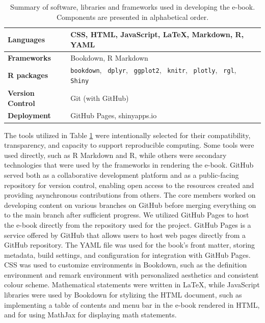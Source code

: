 \documentclass[11pt]{article}
\begin{document}
\renewcommand\arraystretch{1.20}
\begin{table}[H]
\setlength{\belowcaptionskip}{-25pt}
\begin{center}
\begin{tabular}{| l | l |}
\hline
\textbf{Languages}		&	CSS, HTML, JavaScript, LaTeX, Markdown, R, YAML\\
\hline
\textbf{Frameworks} 		&	Bookdown, R Markdown\\
\hline
\textbf{R packages}		&	\texttt{bookdown}, \, \texttt{dplyr}, \, \texttt{ggplot2}, \, \texttt{knitr}, \, \texttt{plotly}, \, \texttt{rgl}, \,\texttt{Shiny}\\
\hline
\textbf{Version Control} 	&	Git (with GitHub)\\
\hline
\textbf{Deployment} 		&	GitHub Pages, shinyapps.io\\
\hline
\end{tabular}
\caption{Summary of software, libraries and frameworks used in developing the e-book. Components are presented in alphabetical order.}
\label{tab:ebook_Technologies}
\end{center}
\end{table}
\renewcommand\arraystretch{1.00}

The tools utilized in Table \ref{tab:ebook_Technologies} were intentionally selected for their compatibility, transparency, and capacity to support reproducible computing. 
Some tools were used directly, such as R Markdown and R, while others were secondary technologies that were used by the frameworks in rendering the e-book.
GitHub served both as a collaborative development platform and as a public-facing repository for version control, enabling open access to the resources created and providing asynchronous contributions from others.
The core members worked on developing content on various branches on GitHub before merging everything on to the main branch after sufficient progress.
We utilized GitHub Pages to host the e-book directly from the repository used for the project.
GitHub Pages is a service offered by GitHub that allows users to host web pages directly from a GitHub repository.
The YAML file was used for the book’s front matter, storing metadata, build settings, and configuration for integration with GitHub Pages.
CSS was used to customize environments in Bookdown, such as the definition environment and remark environment with personalized aesthetics and consistent colour scheme.
Mathematical statements were written in LaTeX, while JavaScript libraries were used by Bookdown for stylizing the HTML document, such as implementing a table of contents and menu bar in the e-book rendered in HTML, and for using MathJax for displaying math statements.
\end{document}
